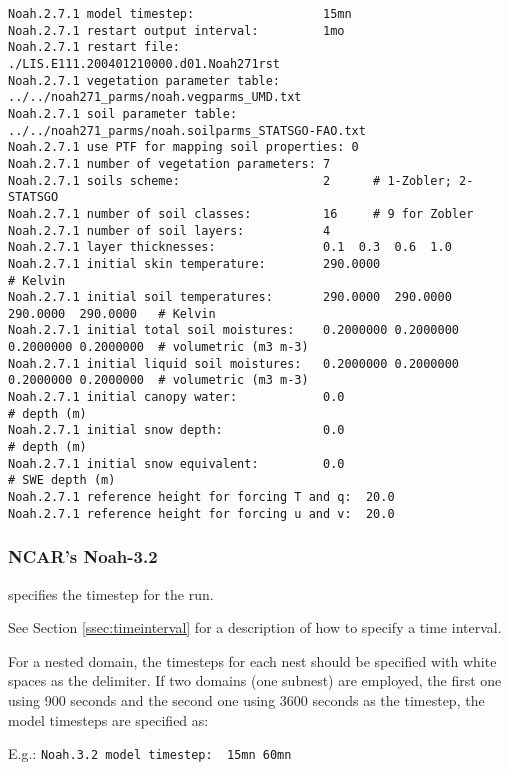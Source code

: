  \begin{Verbatim}[frame=single]
Noah.2.7.1 model timestep:                  15mn
Noah.2.7.1 restart output interval:         1mo
Noah.2.7.1 restart file:                    ./LIS.E111.200401210000.d01.Noah271rst
Noah.2.7.1 vegetation parameter table:      ../../noah271_parms/noah.vegparms_UMD.txt
Noah.2.7.1 soil parameter table:            ../../noah271_parms/noah.soilparms_STATSGO-FAO.txt
Noah.2.7.1 use PTF for mapping soil properties: 0
Noah.2.7.1 number of vegetation parameters: 7
Noah.2.7.1 soils scheme:                    2      # 1-Zobler; 2-STATSGO
Noah.2.7.1 number of soil classes:          16     # 9 for Zobler
Noah.2.7.1 number of soil layers:           4
Noah.2.7.1 layer thicknesses:               0.1  0.3  0.6  1.0
Noah.2.7.1 initial skin temperature:        290.0000                                 # Kelvin
Noah.2.7.1 initial soil temperatures:       290.0000  290.0000  290.0000  290.0000   # Kelvin
Noah.2.7.1 initial total soil moistures:    0.2000000 0.2000000 0.2000000 0.2000000  # volumetric (m3 m-3)
Noah.2.7.1 initial liquid soil moistures:   0.2000000 0.2000000 0.2000000 0.2000000  # volumetric (m3 m-3)
Noah.2.7.1 initial canopy water:            0.0                                      # depth (m)
Noah.2.7.1 initial snow depth:              0.0                                      # depth (m)
Noah.2.7.1 initial snow equivalent:         0.0                                      # SWE depth (m)
Noah.2.7.1 reference height for forcing T and q:  20.0
Noah.2.7.1 reference height for forcing u and v:  20.0
 \end{Verbatim}


 
 \subsubsection{NCAR's Noah-3.2} \label{sssec:lsm_noah32}
 

 
  specifies the timestep for the run.

 See Section \ref{ssec:timeinterval} for a description
 of how to specify a time interval.

 For a nested domain, the timesteps for each nest should be specified
 with white spaces as the delimiter. If two domains (one subnest) are
 employed, the first one using 900 seconds and the second one using
 3600 seconds as the timestep, the model timesteps are specified as:

 E.g.: \quad \verb+Noah.3.2 model timestep:  15mn 60mn+


